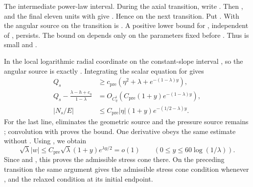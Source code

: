 The intermediate power-law interval. During the axial transition, write
. Then
, and the final eleven units with
 give . Hence
 on the next transition. Put
. With
 the angular source on the transition is
. A positive lower bound for
, independent of , persists. The
bound on  depends only on the parameters fixed before
. Thus  is small and
.

In the local logarithmic radial coordinate on the constant-slope interval
, so the angular source is exactly
. Integrating the scalar
equation for  gives
\begin{equation}
\begin{aligned}
 Q_s&\geq c_{\mathrm{pre}}(\eta^2+\lambda+e^{-(1-\lambda)y}),\\
 Q_s-\frac{\lambda-h+c_\eta}{1-\lambda}
   &=O_{C^1_\eta}\!\left(C_{\mathrm{pre}}(1+y)e^{-(1-\lambda)y}\right),\\
 |N_s/E|&\leq C_{\mathrm{pre}}|\eta|(1+y)e^{-(1/2-\lambda)y}.
\end{aligned}
\tag{A.27}\label{eq:A.27}
\end{equation}
For the last line,  eliminates the geometric source and the pressure
source remains ; convolution with
 proves the bound. One  derivative
obeys the same estimate without . Using
, we obtain
\[
 \sqrt\lambda|w|\leq C_{\mathrm{pre}}\sqrt\lambda(1+y)e^{\lambda y/2}=o(1)
 \qquad(0\leq y\leq60\log(1/\lambda)).
\]
Since  and , this proves the
admissible stress cone there. On the preceding transition the same argument gives the
admissible stress cone condition whenever , and the relaxed
condition at its initial endpoint.

